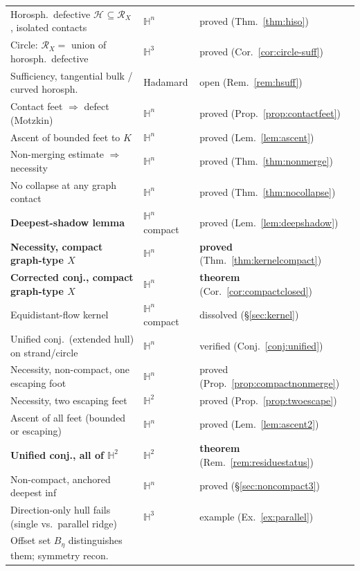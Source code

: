 \documentclass[11pt]{article}
\theoremstyle{remark}
\newcommand{\X}{X}
\newcommand{\Rx}{\mathcal{R}_{\X}}
\newcommand{\Hb}[1]{\mathcal{H}_{#1}}
\begin{document}
\begin{center}
\begin{tabular}{lll}
Horosph.\ defective $\Hb{}\subseteq\Rx$, isolated contacts &
$\mathbb{H}^{n}$ & proved (Thm.~\ref{thm:hiso}) \\
Circle: $\Rx=$ union of horosph.\ defective &
$\mathbb{H}^{3}$ & proved (Cor.~\ref{cor:circle-suff}) \\
Sufficiency, tangential bulk / curved horosph. &
Hadamard & open (Rem.~\ref{rem:hsuff}) \\
\midrule
Contact feet $\Rightarrow$ defect (Motzkin) & $\mathbb{H}^{n}$ &
proved (Prop.~\ref{prop:contactfeet}) \\
Ascent of bounded feet to $K$ & $\mathbb{H}^{n}$ & proved
(Lem.~\ref{lem:ascent}) \\
Non-merging estimate $\Rightarrow$ necessity & $\mathbb{H}^{n}$ &
proved (Thm.~\ref{thm:nonmerge}) \\
No collapse at any graph contact & $\mathbb{H}^{n}$ &
proved (Thm.~\ref{thm:nocollapse}) \\
\textbf{Deepest-shadow lemma} & $\mathbb{H}^{n}$ compact &
proved (Lem.~\ref{lem:deepshadow}) \\
\textbf{Necessity, compact graph-type $\X$} & $\mathbb{H}^{n}$ &
\textbf{proved} (Thm.~\ref{thm:kernelcompact}) \\
\textbf{Corrected conj., compact graph-type $\X$} & $\mathbb{H}^{n}$ &
\textbf{theorem} (Cor.~\ref{cor:compactclosed}) \\
Equidistant-flow kernel & $\mathbb{H}^{n}$ compact &
dissolved (\S\ref{sec:kernel}) \\
Unified conj.\ (extended hull) on strand/circle & $\mathbb{H}^{n}$ &
verified (Conj.~\ref{conj:unified}) \\
Necessity, non-compact, one escaping foot & $\mathbb{H}^{n}$ &
proved (Prop.~\ref{prop:compactnonmerge}) \\
Necessity, two escaping feet & $\mathbb{H}^{2}$ &
proved (Prop.~\ref{prop:twoescape}) \\
Ascent of all feet (bounded or escaping) & $\mathbb{H}^{n}$ &
proved (Lem.~\ref{lem:ascent2}) \\
\textbf{Unified conj., all of $\mathbb{H}^{2}$} & $\mathbb{H}^{2}$ &
\textbf{theorem} (Rem.~\ref{rem:residuestatus}) \\
Non-compact, anchored deepest inf & $\mathbb{H}^{n}$ &
proved (\S\ref{sec:noncompact3}) \\
Direction-only hull fails (single vs.\ parallel ridge) &
$\mathbb{H}^{3}$ & example (Ex.~\ref{ex:parallel}) \\
Offset set $B_{\eta}$ distinguishes them; symmetry recon. &

\end{tabular}
\end{center}
\end{document}
